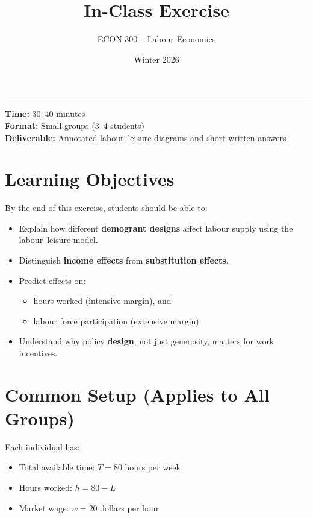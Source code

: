 \documentclass[12pt]{article}
\title{In-Class Exercise}
\author{ECON 300 -- Labour Economics}
\date{Winter 2026}
\begin{document}
\maketitle
\hrule


\vspace{1em}

\textbf{Time:} 30--40 minutes \\
\textbf{Format:} Small groups (3--4 students) \\
\textbf{Deliverable:} Annotated labour--leisure diagrams and short written answers

\vspace{1em}

\section*{Learning Objectives}

By the end of this exercise, students should be able to:

\begin{itemize}
\item Explain how different \textbf{demogrant designs} affect labour supply using the labour--leisure model.
\item Distinguish \textbf{income effects} from \textbf{substitution effects}.
\item Predict effects on:
\begin{itemize}
    \item hours worked (intensive margin), and
    \item labour force participation (extensive margin).
\end{itemize}
\item Understand why policy \textbf{design}, not just generosity, matters for work incentives.
\end{itemize}

\section*{Common Setup (Applies to All Groups)}

Each individual has:

\begin{itemize}
\item Total available time: \( T = 80 \) hours per week
\item Hours worked: \( h = 80 - L \)
\item Market wage: \( w = 20 \) dollars per hour
\end{itemize}
\end{document}
